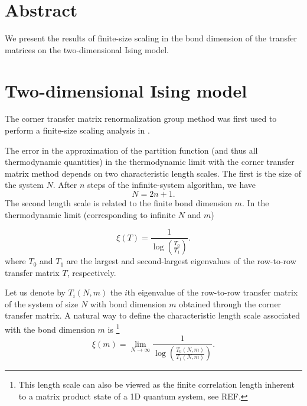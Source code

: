 \section{Abstract}
We present the results of finite-size scaling in the bond dimension of the transfer
matrices on the two-dimensional Ising model.

\section{Two-dimensional Ising model}

The corner transfer matrix renormalization group method was first used to perform a
finite-size scaling analysis in \cite{nishino1996numerical}.


The error in the approximation of the partition function (and thus all thermodynamic
quantities) in the thermodynamic limit with the corner transfer matrix method depends on
two characteristic length
scales. The first is the size of the system $N$. After $n$ steps of the infinite-system
algorithm, we have
\begin{equation}
  N = 2n + 1.
\end{equation}
The second length scale is related to the finite bond dimension $m$. In the thermodynamic
limit (corresponding to infinite $N$ and $m$)



\cite{baxter1982exactly_correlation_length}
\begin{equation}
  \xi(T) = \frac{1}{\log\left(\frac{T_0}{T_1}\right)}.
\end{equation}
where $T_0$ and $T_1$ are the largest and second-largest eigenvalues of the row-to-row
transfer matrix $T$, respectively.

Let us denote by $T_{i}(N, m)$ the $i$th eigenvalue of the row-to-row transfer matrix of
the system of size $N$ with bond dimension $m$ obtained through the corner transfer
matrix. A natural way to define the characteristic length scale associated with the bond
dimension $m$ is \footnote{This length scale can also be viewed as the finite correlation
length inherent to a matrix product state of a 1D quantum system, see REF.}
\begin{equation}
  \xi(m) = \lim_{N \to \infty} \frac{1}{\log\left(\frac{T_0(N, m)}{T_1(N, m)}\right)}.
\end{equation}

